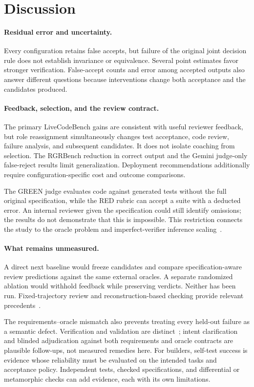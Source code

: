 \section{Discussion}
\label{sec:discussion}

\paragraph{Residual error and uncertainty.}
Every configuration retains false accepts, but failure of the original joint
decision rule does not establish invariance or equivalence. Several point
estimates favor stronger verification. False-accept counts and error among
accepted outputs also answer different questions because interventions change
both acceptance and the candidates produced.

\paragraph{Feedback, selection, and the review contract.}
The primary LiveCodeBench gains are consistent with useful reviewer feedback,
but role reassignment simultaneously changes test acceptance, code review, failure
analysis, and subsequent candidates. It does not isolate coaching from selection.
The RGRBench reduction in correct output and the Gemini judge-only false-reject
results limit generalization. Deployment recommendations additionally require
configuration-specific cost and outcome comparisons.

The GREEN judge evaluates code against generated tests without the full original
specification, while the RED rubric can accept a suite with a deducted error.
An internal reviewer given the specification could still identify omissions;
the results do not demonstrate that this is impossible. This restriction connects
the study to the oracle problem and imperfect-verifier inference
scaling~\cite{barr2015oracle,stroebl2026resampling}.

\paragraph{What remains unmeasured.}
A direct next baseline would freeze candidates and compare specification-aware
review predictions against the same external oracles. A separate randomized
ablation would withhold feedback while preserving verdicts. Neither has been
run. Fixed-trajectory review and reconstruction-based checking provide relevant
precedents~\cite{shum2025swerm,li2026retrace}.

The requirements--oracle mismatch also prevents treating every held-out failure
as a semantic defect. Verification and validation are distinct~\cite{boehm1984vv};
intent clarification~\cite{fakhoury2024ticoder} and blinded adjudication against
both requirements and oracle contracts are plausible follow-ups, not measured
remedies here. For builders, self-test success is evidence whose reliability
must be evaluated on the intended tasks and acceptance policy. Independent tests,
checked specifications, and differential or metamorphic checks can add evidence,
each with its own limitations.
